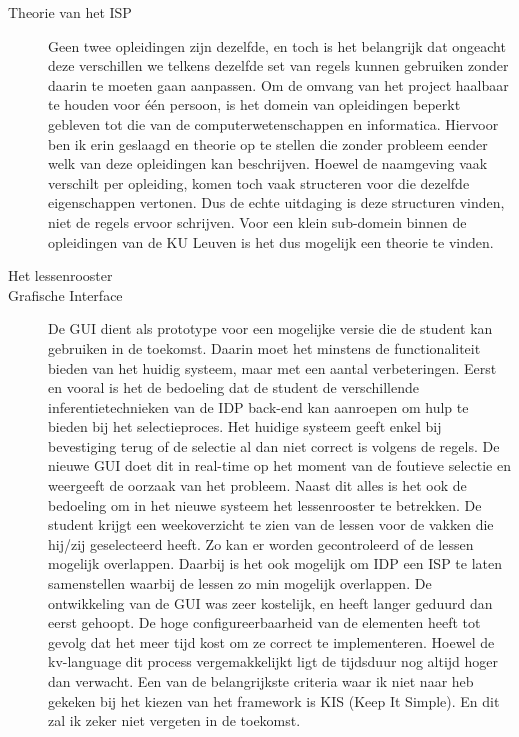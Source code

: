 \begin{description}
\item [Theorie van het ISP] Geen twee opleidingen zijn dezelfde, en toch is het belangrijk dat ongeacht deze verschillen we telkens dezelfde set van regels kunnen gebruiken zonder daarin te moeten gaan aanpassen. Om de omvang van het project haalbaar te houden voor \'{e}\'{e}n persoon, is het domein van opleidingen beperkt gebleven tot die van de computerwetenschappen en informatica. Hiervoor ben ik erin geslaagd en theorie op te stellen die zonder probleem eender welk van deze opleidingen kan beschrijven. Hoewel de naamgeving vaak verschilt per opleiding, komen toch vaak structeren voor die dezelfde eigenschappen vertonen. Dus de echte uitdaging is deze structuren vinden, niet de regels ervoor schrijven. Voor een klein sub-domein binnen de opleidingen van de KU Leuven is het dus mogelijk een theorie te vinden. 

\item [Het lessenrooster] 

\item [Grafische Interface] De GUI dient als prototype voor een mogelijke versie die de student kan gebruiken in de toekomst. Daarin moet het minstens de functionaliteit bieden van het huidig systeem, maar met een aantal verbeteringen. Eerst en vooral is het de bedoeling dat de student de verschillende inferentietechnieken van de IDP back-end kan aanroepen om hulp te bieden bij het selectieproces. Het huidige systeem geeft enkel bij bevestiging terug of de selectie al dan niet correct is  volgens de regels. De nieuwe GUI doet dit in real-time op het moment van de foutieve selectie en weergeeft de oorzaak van het probleem. Naast dit alles is het ook de bedoeling om in het nieuwe systeem het lessenrooster te betrekken. De student krijgt een weekoverzicht te zien van de lessen voor de vakken die  hij/zij geselecteerd heeft. Zo kan er worden gecontroleerd of de lessen mogelijk overlappen. Daarbij is het ook mogelijk om IDP een ISP te laten samenstellen waarbij de lessen zo min mogelijk overlappen. De ontwikkeling van de GUI was zeer kostelijk, en heeft langer geduurd dan eerst gehoopt. De hoge configureerbaarheid van de elementen heeft tot gevolg dat het meer tijd kost om ze correct te implementeren. Hoewel de kv-language dit process vergemakkelijkt ligt de tijdsduur nog altijd hoger dan verwacht. Een van de belangrijkste criteria waar ik niet naar heb gekeken bij het kiezen van het framework is KIS (Keep It Simple). En dit zal ik zeker niet vergeten in de toekomst. 


\end{description}
